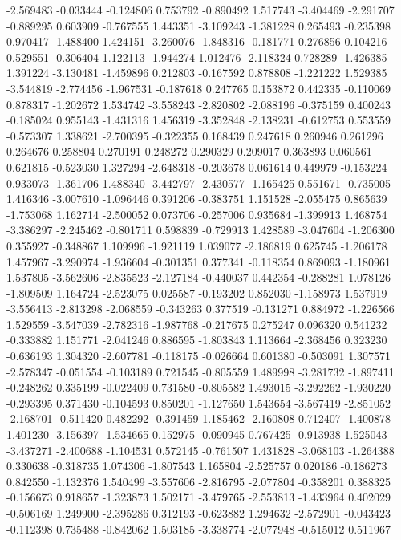 -2.569483
-0.033444
-0.124806
0.753792
-0.890492
1.517743
-3.404469
-2.291707
-0.889295
0.603909
-0.767555
1.443351
-3.109243
-1.381228
0.265493
-0.235398
0.970417
-1.488400
1.424151
-3.260076
-1.848316
-0.181771
0.276856
0.104216
0.529551
-0.306404
1.122113
-1.944274
1.012476
-2.118324
0.728289
-1.426385
1.391224
-3.130481
-1.459896
0.212803
-0.167592
0.878808
-1.221222
1.529385
-3.544819
-2.774456
-1.967531
-0.187618
0.247765
0.153872
0.442335
-0.110069
0.878317
-1.202672
1.534742
-3.558243
-2.820802
-2.088196
-0.375159
0.400243
-0.185024
0.955143
-1.431316
1.456319
-3.352848
-2.138231
-0.612753
0.553559
-0.573307
1.338621
-2.700395
-0.322355
0.168439
0.247618
0.260946
0.261296
0.264676
0.258804
0.270191
0.248272
0.290329
0.209017
0.363893
0.060561
0.621815
-0.523030
1.327294
-2.648318
-0.203678
0.061614
0.449979
-0.153224
0.933073
-1.361706
1.488340
-3.442797
-2.430577
-1.165425
0.551671
-0.735005
1.416346
-3.007610
-1.096446
0.391206
-0.383751
1.151528
-2.055475
0.865639
-1.753068
1.162714
-2.500052
0.073706
-0.257006
0.935684
-1.399913
1.468754
-3.386297
-2.245462
-0.801711
0.598839
-0.729913
1.428589
-3.047604
-1.206300
0.355927
-0.348867
1.109996
-1.921119
1.039077
-2.186819
0.625745
-1.206178
1.457967
-3.290974
-1.936604
-0.301351
0.377341
-0.118354
0.869093
-1.180961
1.537805
-3.562606
-2.835523
-2.127184
-0.440037
0.442354
-0.288281
1.078126
-1.809509
1.164724
-2.523075
0.025587
-0.193202
0.852030
-1.158973
1.537919
-3.556413
-2.813298
-2.068559
-0.343263
0.377519
-0.131271
0.884972
-1.226566
1.529559
-3.547039
-2.782316
-1.987768
-0.217675
0.275247
0.096320
0.541232
-0.333882
1.151771
-2.041246
0.886595
-1.803843
1.113664
-2.368456
0.323230
-0.636193
1.304320
-2.607781
-0.118175
-0.026664
0.601380
-0.503091
1.307571
-2.578347
-0.051554
-0.103189
0.721545
-0.805559
1.489998
-3.281732
-1.897411
-0.248262
0.335199
-0.022409
0.731580
-0.805582
1.493015
-3.292262
-1.930220
-0.293395
0.371430
-0.104593
0.850201
-1.127650
1.543654
-3.567419
-2.851052
-2.168701
-0.511420
0.482292
-0.391459
1.185462
-2.160808
0.712407
-1.400878
1.401230
-3.156397
-1.534665
0.152975
-0.090945
0.767425
-0.913938
1.525043
-3.437271
-2.400688
-1.104531
0.572145
-0.761507
1.431828
-3.068103
-1.264388
0.330638
-0.318735
1.074306
-1.807543
1.165804
-2.525757
0.020186
-0.186273
0.842550
-1.132376
1.540499
-3.557606
-2.816795
-2.077804
-0.358201
0.388325
-0.156673
0.918657
-1.323873
1.502171
-3.479765
-2.553813
-1.433964
0.402029
-0.506169
1.249900
-2.395286
0.312193
-0.623882
1.294632
-2.572901
-0.043423
-0.112398
0.735488
-0.842062
1.503185
-3.338774
-2.077948
-0.515012
0.511967
